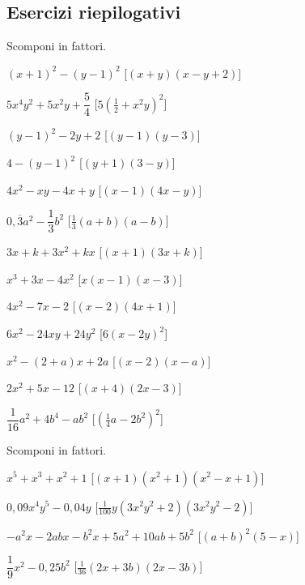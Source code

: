 \subsection{Esercizi riepilogativi}

\begin{esercizio}[\Ast]
 \label{ese:17.19}
 Scomponi in fattori.
 \begin{multicols}{2}
 \begin{enumeratea}
 \item \((x+1)^{2}-(y-1)^{2}\) \hfill [\((x+y)\left(x-y+2\right)\)]
\item \(5x^{4}y^{2}+5x^{2}y+\dfrac{5}{4}\) 
 \hfill [\(5\left(\frac{1}{2}+x^{2}y\right)^{2}\)]
\item \((y-1)^{2}-2y+2\) \hfill [\((y-1)\left(y-3\right)\)]
\item \(4-(y-1)^{2}\) \hfill [\((y+1)\left(3-y\right)\)]
\item \(4x^{2}-xy-4x+y\) \hfill [\((x-1)\left(4x-y\right)\)]
\item \(0,\overline{{3}}a^{2}-\dfrac{1}{3}b^{2}\) 
 \hfill [\(\frac{1}{3}(a+b)\left(a-b\right)\)]
\item \(3x+k+3x^{2}+kx\) \hfill [\((x+1)\left(3x+k\right)\)]
\item \(x^{3}+3x-4x^{2}\) \hfill [\(x(x-1)\left(x-3\right)\)]
\item \(4x^{2}-7x-2\) \hfill [\((x-2)\left(4x+1\right)\)]
\item \(6x^{2}-24xy+24y^{2}\) \hfill [\(6\left(x-2y\right)^{2}\)]
\item \(x^{2}-(2+a)x+2a\)
  \hfill [\((x-2)\left(x-a\right)\)]
\item \(2x^{2}+5x-12\)
  \hfill [\((x+4)\left(2x-3\right)\)]
\item \(\dfrac{1}{16}a^{2}+4b^{4}-ab^{2}\)
  \hfill [\(\left(\frac{1}{4}a-2b^{2}\right)^{2}\)]
 \end{enumeratea}
 \end{multicols}
\end{esercizio}

\newpage %

\begin{esercizio}[\Ast]
 \label{ese:17.20}
 Scomponi in fattori.
 \begin{enumeratea}
\item \(x^{5}+x^{3}+x^{2}+1\)
  \hfill [\((x+1)\left(x^{2}+1\right)\left(x^{2}-x+1\right)\)]
\item \(0,09x^{4}y^{5}-0,04y\)
  \hfill [\(\frac{1}{100}y\left(3x^{2}y^{2}+2\right)\left(3x^{2}y^{2}-2\right)\)]
\item \(-a^{2}x-2{abx}-b^{2}x+5a^{2}+10{ab}+5b^{2}\)
  \hfill [\((a+b)^{2}\left(5-x\right)\)]
\item \(\dfrac{1}{9}x^{2}-0,25b^{2}\)
  \hfill [\(\frac{1}{36}(2x+3b)\left(2x-3b\right)\)]
 \end{enumeratea}
\end{esercizio}

